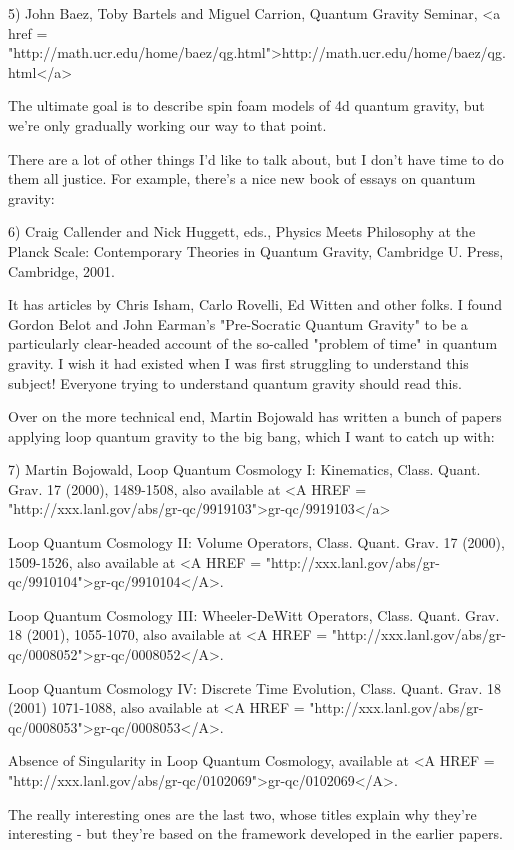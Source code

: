 5) John Baez, Toby Bartels and Miguel Carrion, Quantum Gravity Seminar,
<a href = "http://math.ucr.edu/home/baez/qg.html">http://math.ucr.edu/home/baez/qg.html</a>

The ultimate goal is to describe spin foam models of 4d quantum
gravity, but we're only gradually working our way to that point.

There are a lot of other things I'd like to talk about, but I don't have
time to do them all justice.  For example, there's a nice new book of
essays on quantum gravity:

6) Craig Callender and Nick Huggett, eds., Physics Meets Philosophy at
the Planck Scale: Contemporary Theories in Quantum Gravity, Cambridge
U. Press, Cambridge, 2001.  

It has articles by Chris Isham, Carlo Rovelli, Ed Witten and other folks.
I found Gordon Belot and John Earman's "Pre-Socratic
Quantum Gravity" to be a particularly clear-headed account of the
so-called "problem of time" in quantum gravity.  I wish it had existed
when I was first struggling to understand this subject!  Everyone trying
to understand quantum gravity should read this.

Over on the more technical end, Martin Bojowald has written a
bunch of papers applying loop quantum gravity to the big bang,
which I want to catch up with:

7) Martin Bojowald, Loop Quantum Cosmology I: Kinematics, 
Class. Quant. Grav. 17 (2000), 1489-1508, also available at 
<A HREF = "http://xxx.lanl.gov/abs/gr-qc/9919103">gr-qc/9919103</a>

Loop Quantum Cosmology II: Volume Operators, Class. Quant. Grav. 
17 (2000), 1509-1526, also available at <A HREF = "http://xxx.lanl.gov/abs/gr-qc/9910104">gr-qc/9910104</A>.

Loop Quantum Cosmology III: Wheeler-DeWitt Operators,
Class. Quant. Grav. 18 (2001), 1055-1070, also available at
<A HREF = "http://xxx.lanl.gov/abs/gr-qc/0008052">gr-qc/0008052</A>.

Loop Quantum Cosmology IV: Discrete Time Evolution, 
Class. Quant. Grav. 18 (2001) 1071-1088, also available at
<A HREF = "http://xxx.lanl.gov/abs/gr-qc/0008053">gr-qc/0008053</A>.

Absence of Singularity in Loop Quantum Cosmology, available
at <A HREF = "http://xxx.lanl.gov/abs/gr-qc/0102069">gr-qc/0102069</A>.

The really interesting ones are the last two, whose titles explain
why they're interesting - but they're based on the framework developed
in the earlier papers.

